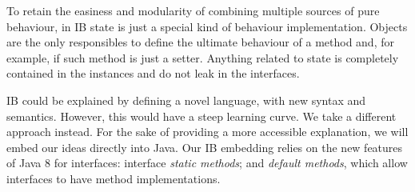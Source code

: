 To retain the easiness and modularity of combining multiple sources of
pure behaviour, in IB state is just a special kind of behaviour
implementation.
 Objects are the only responsibles to define the
ultimate behaviour of a method and, for example, if such method is
just a setter. Anything related to state is completely contained in
the instances and do not leak in the interfaces.

IB could be explained by defining a novel language, with new syntax
and semantics. However, this would have a steep learning curve.  We
take a different approach instead. For the sake of providing a more
accessible explanation, we will embed our ideas directly into Java. 
Our IB embedding relies on the
new features of Java 8 for interfaces: interface \emph{static methods}; and
\emph{default methods}, which allow interfaces to have method
implementations. 


%
%
%
%

